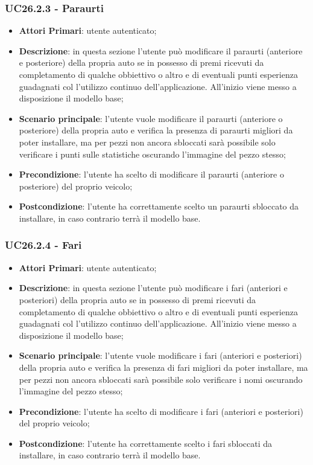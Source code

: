 \subsubsection{UC26.2.3 - Paraurti}
\begin{itemize}
	\item \textbf{Attori Primari}: utente autenticato;
	\item \textbf{Descrizione}: in questa sezione l'utente può modificare il paraurti (anteriore e posteriore) della propria auto se in possesso di premi ricevuti da completamento di qualche obbiettivo o altro e di eventuali punti esperienza guadagnati col l'utilizzo continuo dell'applicazione.
	All'inizio viene messo a disposizione il modello base;
	\item \textbf{Scenario principale}: l'utente vuole modificare il paraurti (anteriore o posteriore) della propria auto e verifica la presenza di paraurti migliori da poter installare, ma per pezzi non ancora sbloccati sarà possibile solo verificare i punti sulle statistiche oscurando l'immagine del pezzo stesso;
	\item \textbf{Precondizione}: l'utente ha scelto di modificare il paraurti (anteriore o posteriore) del proprio veicolo; 
	\item \textbf{Postcondizione}: l'utente ha correttamente scelto un paraurti sbloccato da installare, in caso contrario terrà il modello base.
\end{itemize}
\subsubsection{UC26.2.4 - Fari}
\begin{itemize}
	\item \textbf{Attori Primari}: utente autenticato;
	\item \textbf{Descrizione}: in questa sezione l'utente può modificare i fari (anteriori e posteriori) della propria auto se in possesso di premi ricevuti da completamento di qualche obbiettivo o altro e di eventuali punti esperienza guadagnati col l'utilizzo continuo dell'applicazione.
	All'inizio viene messo a disposizione il modello base;
	\item \textbf{Scenario principale}: l'utente vuole modificare i fari (anteriori e posteriori) della propria auto e verifica la presenza di fari migliori da poter installare, ma per pezzi non ancora sbloccati sarà possibile solo verificare i nomi oscurando l'immagine del pezzo stesso;
	\item \textbf{Precondizione}: l'utente ha scelto di modificare i fari (anteriori e posteriori) del proprio veicolo; 
	\item \textbf{Postcondizione}: l'utente ha correttamente scelto i fari sbloccati da installare, in caso contrario terrà il modello base.
\end{itemize}
